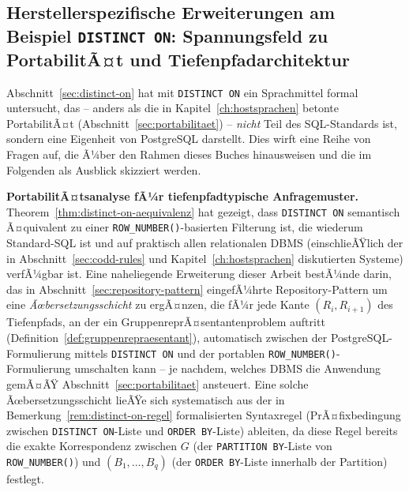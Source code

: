 ﻿\documentclass[a4paper,12pt]{report}
\theoremstyle{definition}
\theoremstyle{remark}
\begin{document}
\subsection{Herstellerspezifische Erweiterungen am Beispiel \texttt{DISTINCT ON}: Spannungsfeld zu PortabilitÃ¤t und Tiefenpfadarchitektur}
\label{sec:ausblick-distinct-on}

Abschnitt~\ref{sec:distinct-on} hat mit \texttt{DISTINCT ON} ein
Sprachmittel formal untersucht, das -- anders als die in
Kapitel~\ref{ch:hostsprachen} betonte PortabilitÃ¤t
(Abschnitt~\ref{sec:portabilitaet}) -- \emph{nicht} Teil des
SQL-Standards ist, sondern eine Eigenheit von PostgreSQL darstellt.
Dies wirft eine Reihe von Fragen auf, die Ã¼ber den Rahmen dieses
Buches hinausweisen und die im Folgenden als Ausblick skizziert
werden.

\textbf{PortabilitÃ¤tsanalyse fÃ¼r tiefenpfadtypische Anfragemuster.}
Theorem~\ref{thm:distinct-on-aequivalenz} hat gezeigt, dass
\texttt{DISTINCT ON} semantisch Ã¤quivalent zu einer
\texttt{ROW\_NUMBER()}-basierten Filterung ist, die wiederum
Standard-SQL ist und auf praktisch allen relationalen DBMS
(einschlieÃŸlich der in Abschnitt~\ref{sec:codd-rules} und
Kapitel~\ref{ch:hostsprachen} diskutierten Systeme) verfÃ¼gbar ist.
Eine naheliegende Erweiterung dieser Arbeit bestÃ¼nde darin, das in
Abschnitt~\ref{sec:repository-pattern} eingefÃ¼hrte
Repository-Pattern um eine \emph{Ãœbersetzungsschicht} zu ergÃ¤nzen,
die fÃ¼r jede Kante $(R_i,R_{i+1})$ des Tiefenpfads, an der ein
GruppenreprÃ¤sentantenproblem auftritt
(Definition~\ref{def:gruppenrepraesentant}), automatisch zwischen der
PostgreSQL-Formulierung mittels \texttt{DISTINCT ON} und der
portablen \texttt{ROW\_NUMBER()}-Formulierung umschalten kann -- je
nachdem, welches DBMS die Anwendung gemÃ¤ÃŸ
Abschnitt~\ref{sec:portabilitaet} ansteuert. Eine solche
Ãœbersetzungsschicht lieÃŸe sich systematisch aus der in
Bemerkung~\ref{rem:distinct-on-regel} formalisierten Syntaxregel
(PrÃ¤fixbedingung zwischen \texttt{DISTINCT ON}-Liste und
\texttt{ORDER BY}-Liste) ableiten, da diese Regel bereits die exakte
Korrespondenz zwischen $G$ (der \texttt{PARTITION BY}-Liste von
\texttt{ROW\_NUMBER()}) und $(B_1,\ldots,B_q)$ (der
\texttt{ORDER BY}-Liste innerhalb der Partition) festlegt.
\end{document}
